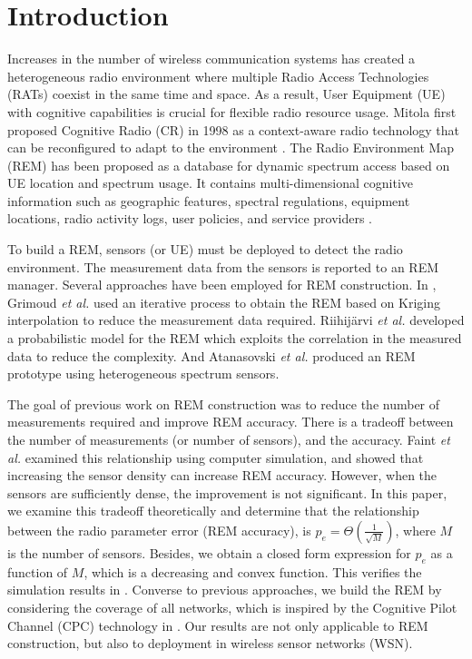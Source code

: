 \documentclass[conference]{IEEEtran}
\begin{document}
\IEEEpeerreviewmaketitle

\section{Introduction}


Increases in the number of wireless communication systems has created a heterogeneous radio environment
where multiple Radio Access Technologies (RATs) coexist in the same time and space.
As a result, User Equipment (UE) with cognitive capabilities is crucial for flexible radio resource usage.
Mitola first proposed Cognitive Radio (CR) in 1998 as a context-aware radio technology that can be reconfigured to adapt to the environment \cite{CR_Mitola}.
The Radio Environment Map (REM) has been proposed as a database for dynamic spectrum access based on UE location and spectrum usage.
It contains multi-dimensional cognitive information such as geographic features, spectral regulations, equipment locations, radio activity logs,
user policies, and service providers \cite{CR_Performance_Evaluation}.

To build a REM, sensors (or UE) must be deployed to detect the radio environment.
The measurement data from the sensors is reported to an REM manager.
Several approaches have been employed for REM construction.
In \cite{REM_Fast_Algorithm}, Grimoud \emph{et al.} used an iterative process to obtain the REM based on Kriging interpolation
to reduce the measurement data required.
Riihij\"{a}rvi \emph{et al.} \cite{REM_spatial_statistics} developed a probabilistic model for the REM which
exploits the correlation in the measured data to reduce the complexity.
And Atanasovski \emph{et al.} \cite{REM_Heterogeneous_sensor} produced an REM prototype using heterogeneous spectrum sensors.

The goal of previous work on REM construction was to reduce the number of measurements required and improve REM accuracy.
There is a tradeoff between the number of measurements (or number of sensors), and the accuracy.
Faint \emph{et al.} \cite{REM_number_sensor_and_REM} examined this relationship using computer simulation,
and showed that increasing the sensor density can increase REM accuracy.
However, when the sensors are sufficiently dense, the improvement is not significant.
In this paper, we examine this tradeoff theoretically and determine that the relationship between the radio parameter error (REM accuracy),
is ${p_e} = \Theta (\frac{1}{{\sqrt M }})$, where $M$ is the number of sensors.
Besides, we obtain a closed form expression for $p_e$ as a function of $M$, which is a decreasing and convex function.
This verifies the simulation results in \cite{REM_number_sensor_and_REM}.
Converse to previous approaches, we build the REM by considering the coverage of all networks,
which is inspired by the Cognitive Pilot Channel (CPC) technology in \cite{CPC_Ondemand}.
Our results are not only applicable to REM construction, but also to deployment in wireless sensor networks (WSN).
\end{document}

